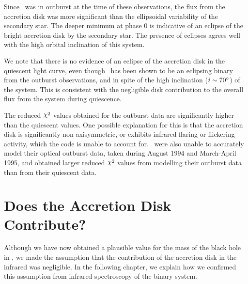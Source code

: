 Since \groj\ was in outburst at the time of these observations, the
flux from the accretion disk was more significant than the ellipsoidal
variability of the secondary star. The deeper minimum at phase 0 is
indicative of an eclipse of the bright accretion disk by the
secondary star. The presence of eclipses agrees well with the high
orbital inclination of this system. %

\vspace{\myparskip}

We note that there is no evidence of an eclipse of the accretion disk
in the quiescent light curve, even though \groj\ has been shown to be
an eclipsing binary from the outburst observations, and in spite of the high inclination ($i\sim70\hbox{$^\circ$}$) of the system. This is consistent
with the negligible disk contribution to the overall flux from the
system during quiescence. %

\vspace{\myparskip}

The reduced $\Chi^2$ values obtained for the outburst data are
significantly higher than the quiescent values. One possible
explanation for this is that the accretion disk is significantly
non-axisymmetric, or exhibits infrared flaring or flickering activity, which the code is unable to account for. %
%
\ were also unable to accurately model their optical outburst data, taken
during August 1994 and March-April 1995, and obtained larger reduced
$\Chi^2$ values from modelling their outburst data than from their quiescent data. %



\section{Does the Accretion Disk Contribute?}\label{cha:ELC:sec:ConfirmingOurAssumption}

Although we have now obtained a plausible value for the mass of the black hole in \groj, we made the assumption that the contribution of the accretion disk in the infrared was negligible. In the following chapter, we explain how we confirmed this assumption from infrared spectroscopy of the binary system.

